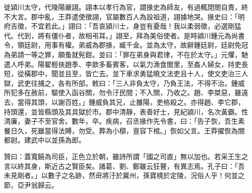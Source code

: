 \begin{pinyinscope}
徙潁川太守，代陵陽嚴詡。詡本以孝行為官，謂掾史為師友，有過輒閉閤自責，終不大言。郡中亂，王莽遣使徵詡，官屬數百人為設祖道，詡據地哭。掾史曰：「明府吉徵，不宜若此。」詡曰：「吾哀潁川士，身豈有憂哉！我以柔弱徵，必選剛猛代。代到，將有僵仆者，故相弔耳。」詡至，拜為美俗使者。是時潁川鍾元為尚書令，領廷尉，用事有權。弟威為郡掾，臧千金。並為太守，故辭鍾廷尉，廷尉免冠為弟請一等之罪，願蚤就髡鉗。並曰：「罪在弟身與君律，不在於太守。」元懼，馳遣人呼弟。陽翟輕俠趙季、李款多畜賓客，以氣力漁食閭里，至姦人婦女，持吏長短，從橫郡中，聞並且至，皆亡去。並下車求勇猛曉文法吏且十人，使文吏治三人獄，武吏往捕之，各有所部。敕曰：「三人非負太守，乃負王法，不得不治。鍾威所犯多在赦前，驅使入函谷關，勿令汙民間；不入關，乃收之。趙、李桀惡，雖遠去，當得其頭，以謝百姓。」鍾威負其兄，止雒陽，吏格殺之。亦得趙、李它郡，持頭還，並皆縣頭及其具獄於市。郡中清靜，表善好士，見紀潁川，名次黃霸。性清廉，妻子不至官舍。數年，卒。疾病，召丞掾作先令書，曰：「告子恢，吾生素餐日久，死雖當得法賻，勿受。葬為小槨，亶容下棺。」恢如父言。王莽擢恢為關都尉。建武中以並孫為郎。

贊曰：蓋寬饒為司臣，正色立於朝，雖詩所謂「國之司直」無以加也。若采王生之言以終其身，斯近古之賢臣矣。諸葛、劉、鄭雖云狂瞽，有異志焉。孔子曰：「吾未見剛者。」以數子之名跡，然毌將汙於冀州，孫寶橈於定陵，況俗人乎！何並之節，亞尹翁歸云。


\end{pinyinscope}